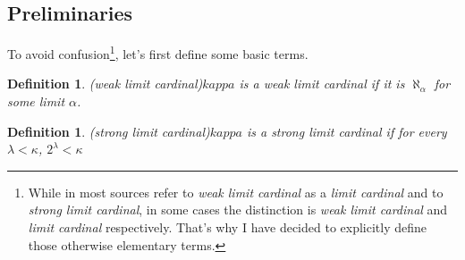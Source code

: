 \documentclass[12pt,a4paper]{article}
\newtheorem{definition}[theorem]{Definition}
\begin{document}
\subsection{Preliminaries}
To avoid confusion\footnote{While in most sources refer to \emph{weak limit cardinal} as a \emph{limit cardinal} and to \emph{strong limit cardinal}, in some cases the distinction is \emph{weak limit cardinal} and \emph{limit cardinal} respectively. That's why I have decided to explicitly define those otherwise elementary terms.}, let's first define some basic terms.
\begin{definition}(weak limit cardinal)\label{def:weak_limit}
$kappa$ is a \emph{weak limit cardinal} if it is $\aleph_\alpha$ for some limit $\alpha$.
\end{definition}
\begin{definition}(strong limit cardinal)\label{def:strong_limit}
$kappa$ is a \emph{strong limit cardinal} if for every $\lambda < \kappa$, $2^\lambda < \kappa$
\end{definition}
\end{document}
